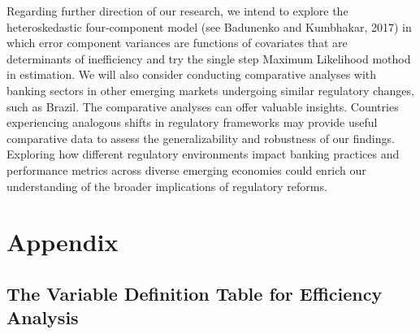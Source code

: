 \documentclass[
  12pt,
  a4paper,
]{scrreprt}
\begin{document}
Regarding further direction of our research, we intend to explore the
heteroskedastic four-component model (see Badunenko and Kumbhakar, 2017)
in which error component variances are functions of covariates that are
determinants of inefficiency and try the single step Maximum Likelihood
mothod in estimation. We will also consider conducting comparative
analyses with banking sectors in other emerging markets undergoing
similar regulatory changes, such as Brazil. The comparative analyses can
offer valuable insights. Countries experiencing analogous shifts in
regulatory frameworks may provide useful comparative data to assess the
generalizability and robustness of our findings. Exploring how different
regulatory environments impact banking practices and performance metrics
across diverse emerging economies could enrich our understanding of the
broader implications of regulatory reforms.

\newpage

\section{Appendix}\label{appendix}

\subsection{The Variable Definition Table for Efficiency
Analysis}\label{the-variable-definition-table-for-efficiency-analysis}
\end{document}
